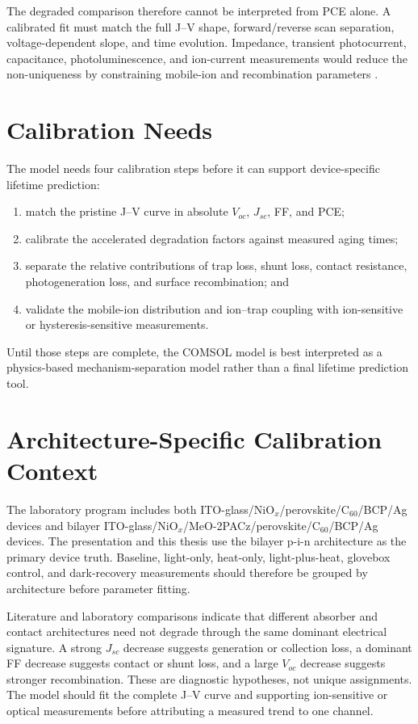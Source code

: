 The degraded comparison therefore cannot be interpreted from PCE alone. A
calibrated fit must match the full J--V shape, forward/reverse scan separation,
voltage-dependent slope, and time evolution. Impedance, transient photocurrent,
capacitance, photoluminescence, and ion-current measurements would reduce the
non-uniqueness by constraining mobile-ion and recombination parameters
\cite{SchmidtPRX_2025,Elhorst_2025,SchmidtACS_2025}.

\section{Calibration Needs}

The model needs four calibration steps before it can support device-specific
lifetime prediction:
\begin{enumerate}
\item match the pristine J--V curve in absolute $V_{oc}$, $J_{sc}$, FF, and
PCE;
\item calibrate the accelerated degradation factors against measured aging
times;
\item separate the relative contributions of trap loss, shunt loss, contact
resistance, photogeneration loss, and surface recombination; and
\item validate the mobile-ion distribution and ion--trap coupling with
ion-sensitive or hysteresis-sensitive measurements.
\end{enumerate}

Until those steps are complete, the COMSOL model is best interpreted as a
physics-based mechanism-separation model rather than a final lifetime
prediction tool.

\section{Architecture-Specific Calibration Context}

The laboratory program includes both
ITO-glass/NiO$_x$/perovskite/C$_{60}$/BCP/Ag devices and bilayer
ITO-glass/NiO$_x$/MeO-2PACz/perovskite/C$_{60}$/BCP/Ag devices. The
presentation and this thesis use the bilayer p-i-n architecture as the primary
device truth. Baseline, light-only, heat-only, light-plus-heat, glovebox
control, and dark-recovery measurements should therefore be grouped by
architecture before parameter fitting.

Literature and laboratory comparisons indicate that different absorber and
contact architectures need not degrade through the same dominant electrical
signature. A strong $J_{sc}$ decrease suggests generation or collection loss,
a dominant FF decrease suggests contact or shunt loss, and a large $V_{oc}$
decrease suggests stronger recombination. These are diagnostic hypotheses, not
unique assignments. The model should fit the complete J--V curve and supporting
ion-sensitive or optical measurements before attributing a measured trend to
one channel.
